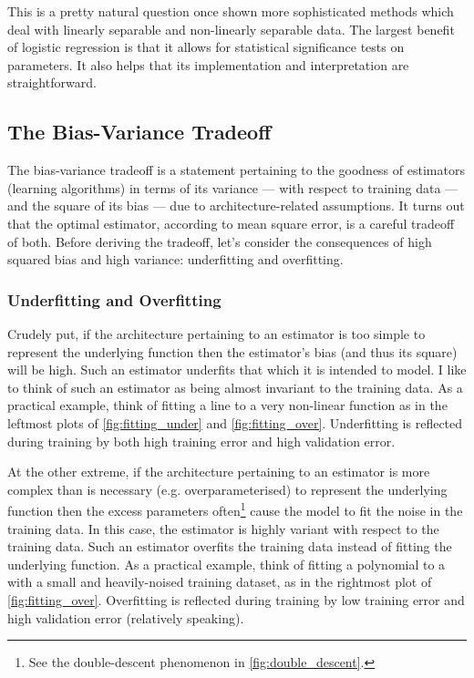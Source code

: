 \documentclass[11pt]{article}
\begin{document}
\begin{tcolorbox}[title={\centering\textbf{Logistic regression $>$ SVM/RF when?}}, colback=myLightBlue, colbacktitle=myDarkBlue, colframe=myDarkBlue, coltitle=white]
    This is a pretty natural question once shown more sophisticated methods which deal with linearly separable and non-linearly separable data. The largest benefit of logistic regression is that it allows for statistical significance tests on parameters. It also helps that its implementation and interpretation are straightforward.
\end{tcolorbox}

\subsection{\REV{: }The Bias-Variance Tradeoff}
The bias-variance tradeoff is a statement pertaining to the goodness of estimators (learning algorithms) in terms of its variance — with respect to training data — and the square of its bias — due to architecture-related assumptions. It turns out that the optimal estimator, according to mean square error, is a careful tradeoff of both. Before deriving the tradeoff, let's consider the consequences of high squared bias and high variance: underfitting and overfitting.

\subsubsection{Underfitting and Overfitting}
Crudely put, if the architecture pertaining to an estimator is too simple to represent the underlying function then the estimator's bias (and thus its square) will be high. Such an estimator underfits that which it is intended to model. I like to think of such an estimator as being almost invariant to the training data. As a practical example, think of fitting a line to a very non-linear function as in the leftmost plots of \autoref{fig:fitting_under} and \autoref{fig:fitting_over}. Underfitting is reflected during training by both high training error and high validation error.

At the other extreme, if the architecture pertaining to an estimator is more complex than is necessary (e.g. overparameterised) to represent the underlying function then the excess parameters often\footnote{See the double-descent phenomenon in \autoref{fig:double_descent}.} cause the model to fit the noise in the training data. In this case, the estimator is highly variant with respect to the training data. Such an estimator overfits the training data instead of fitting the underlying function. As a practical example, think of fitting a polynomial to a with a small and heavily-noised training dataset, as in the rightmost plot of \autoref{fig:fitting_over}. Overfitting is reflected during training by low training error and high validation error (relatively speaking).
\end{document}
